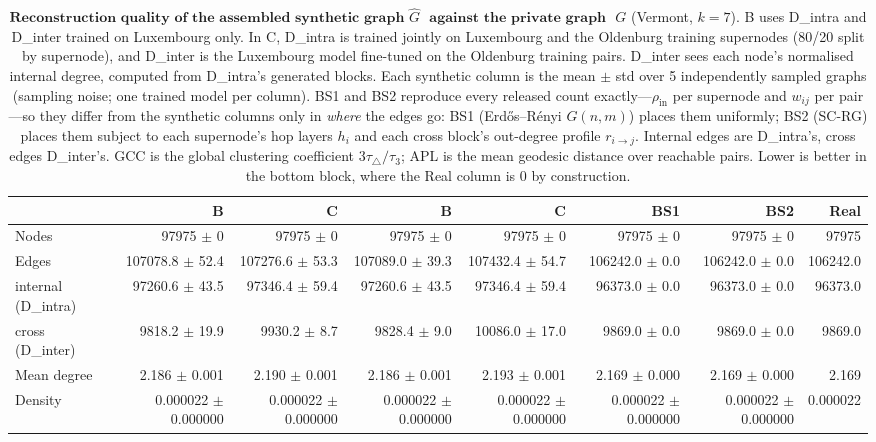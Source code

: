 \begin{table}[H]
\centering
\caption{$\textbf{Reconstruction quality of the assembled synthetic graph}$
$\widehat{G}$ $\textbf{ against the private graph }$ $G$ (Vermont, $k{=}7$).
B uses D\_intra and D\_inter trained on Luxembourg only. In C, D\_intra is trained jointly on Luxembourg and the Oldenburg training supernodes (80/20 split by supernode), and D\_inter is the Luxembourg model fine-tuned on the Oldenburg training pairs. D\_inter sees each node's normalised internal degree, computed from D\_intra's generated blocks. Each synthetic column is the
mean $\pm$ std over 5 independently sampled graphs (sampling noise; one trained
model per column). BS1 and BS2 reproduce every released count exactly---$\rho_{\mathrm{in}}$
per supernode and $w_{ij}$ per pair---so they differ from the synthetic columns
only in \emph{where} the edges go: BS1 (Erd\H{o}s--R\'enyi $G(n,m)$) places them
uniformly; BS2 (SC-RG) places them subject to each supernode's hop layers $h_i$ and
each cross block's out-degree profile $r_{i\to j}$. Internal edges are D\_intra's, cross edges
D\_inter's. GCC is the global clustering coefficient $3\tau_{\triangle}/\tau_{3}$;
APL is the mean geodesic distance over reachable pairs. Lower is better in the
bottom block, where the Real column is $0$ by construction.}
\label{tab:lsyn-vermont-k7}
\begin{tabular}{lrrrrrrr}
\toprule
 & B & C & B & C & BS1 & BS2 & Real \\
\midrule
Nodes                         & 97975 $\pm$ 0 & 97975 $\pm$ 0 & 97975 $\pm$ 0 & 97975 $\pm$ 0 & 97975 $\pm$ 0 & 97975 $\pm$ 0 & 97975 \\
Edges                         & 107078.8 $\pm$ 52.4 & 107276.6 $\pm$ 53.3 & 107089.0 $\pm$ 39.3 & 107432.4 $\pm$ 54.7 & 106242.0 $\pm$ 0.0 & 106242.0 $\pm$ 0.0 & 106242.0 \\
\quad internal (D\_intra)     & 97260.6 $\pm$ 43.5 & 97346.4 $\pm$ 59.4 & 97260.6 $\pm$ 43.5 & 97346.4 $\pm$ 59.4 & 96373.0 $\pm$ 0.0 & 96373.0 $\pm$ 0.0 & 96373.0 \\
\quad cross (D\_inter)        & 9818.2 $\pm$ 19.9 & 9930.2 $\pm$ 8.7 & 9828.4 $\pm$ 9.0 & 10086.0 $\pm$ 17.0 & 9869.0 $\pm$ 0.0 & 9869.0 $\pm$ 0.0 & 9869.0 \\
Mean degree                   & 2.186 $\pm$ 0.001 & 2.190 $\pm$ 0.001 & 2.186 $\pm$ 0.001 & 2.193 $\pm$ 0.001 & 2.169 $\pm$ 0.000 & 2.169 $\pm$ 0.000 & 2.169 \\
Density                       & 0.000022 $\pm$ 0.000000 & 0.000022 $\pm$ 0.000000 & 0.000022 $\pm$ 0.000000 & 0.000022 $\pm$ 0.000000 & 0.000022 $\pm$ 0.000000 & 0.000022 $\pm$ 0.000000 & 0.000022 \\

\end{tabular}
\end{table}
